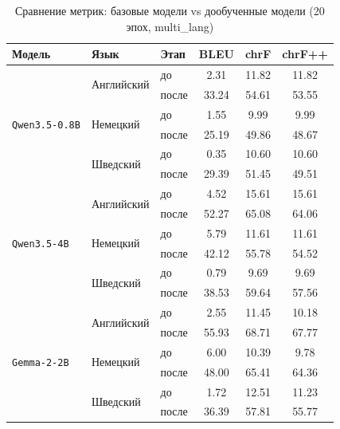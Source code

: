 \documentclass[14pt,a4paper]{extreport}
\begin{document}
\begin{table}[H]
\centering
\caption{Сравнение метрик: базовые модели vs дообученные модели (20 эпох, multi\_lang)}
\label{tab:comparison_multi_lang}
\begin{tabular}{|l|l|l|c|c|c|}
\hline
\textbf{Модель} & \textbf{Язык} & \textbf{Этап} & \textbf{BLEU} & \textbf{chrF} & \textbf{chrF++} \\
\hline
\multirow{6}{*}{\texttt{Qwen3.5-0.8B}} & \multirow{2}{*}{Английский} & до & 2.31 & 11.82 & 11.82 \\
\cline{3-6}
& & после & 33.24 & 54.61 & 53.55 \\
\cline{2-6}
& \multirow{2}{*}{Немецкий} & до & 1.55 & 9.99 & 9.99 \\
\cline{3-6}
& & после & 25.19 & 49.86 & 48.67 \\
\cline{2-6}
& \multirow{2}{*}{Шведский} & до & 0.35 & 10.60 & 10.60 \\
\cline{3-6}
& & после & 29.39 & 51.45 & 49.51 \\
\hline
\multirow{6}{*}{\texttt{Qwen3.5-4B}} & \multirow{2}{*}{Английский} & до & 4.52 & 15.61 & 15.61 \\
\cline{3-6}
& & после & 52.27 & 65.08 & 64.06 \\
\cline{2-6}
& \multirow{2}{*}{Немецкий} & до & 5.79 & 11.61 & 11.61 \\
\cline{3-6}
& & после & 42.12 & 55.78 & 54.52 \\
\cline{2-6}
& \multirow{2}{*}{Шведский} & до & 0.79 & 9.69 & 9.69 \\
\cline{3-6}
& & после & 38.53 & 59.64 & 57.56 \\
\hline
\multirow{6}{*}{\texttt{Gemma-2-2B}} & \multirow{2}{*}{Английский} & до & 2.55 & 11.45 & 10.18 \\
\cline{3-6}
& & после & 55.93 & 68.71 & 67.77 \\
\cline{2-6}
& \multirow{2}{*}{Немецкий} & до & 6.00 & 10.39 & 9.78 \\
\cline{3-6}
& & после & 48.00 & 65.41 & 64.36 \\
\cline{2-6}
& \multirow{2}{*}{Шведский} & до & 1.72 & 12.51 & 11.23 \\
\cline{3-6}
& & после & 36.39 & 57.81 & 55.77 \\
\hline
\end{tabular}
\end{table}
\end{document}

